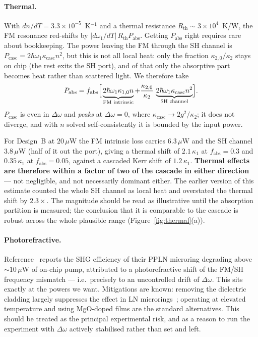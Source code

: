 \documentclass[11pt,a4paper]{article}
\newcommand{\Dom}{\Delta\omega}
\newcommand{\kcasc}{\kappa_{\text{casc}}}
\begin{document}
\paragraph{Thermal.}  With
$dn/dT=3.3\times10^{-5}$~K$^{-1}$ and a thermal resistance
$R_{\text{th}}\sim3\times10^4$~K/W, the FM resonance red-shifts by
$|d\omega_1/dT|\,R_{\text{th}}P_{\text{abs}}$.  Getting $P_{\text{abs}}$
right requires care about bookkeeping.  The power leaving the FM through
the SH channel is $P_{\text{casc}}=2\hbar\omega_1\kcasc n^2$, but this is
not all local heat: only the fraction $\kappa_{2,0}/\kappa_2$ stays on
chip (the rest exits the SH port), and of that only the absorptive part
becomes heat rather than scattered light.  We therefore take
\begin{equation}
  P_{\text{abs}}=f_{\text{abs}}\Bigl[\,
     \underbrace{2\hbar\omega_1\kappa_{1,0}n}_{\text{FM intrinsic}}
     +\frac{\kappa_{2,0}}{\kappa_2}\,
     \underbrace{2\hbar\omega_1\kcasc n^2}_{\text{SH channel}}\Bigr].
\end{equation}
$P_{\text{casc}}$ is even in $\Dom$ and \emph{peaks} at $\Dom=0$, where
$\kcasc\to2g^2/\kappa_2$; it does not diverge, and with $n$ solved
self-consistently it is bounded by the input power.

For Design~B at $20\,\mu$W the FM intrinsic loss carries $6.3\,\mu$W and
the SH channel $3.8\,\mu$W (half of it out the port), giving a thermal
shift of $2.1\,\kappa_1$ at $f_{\text{abs}}=0.3$ and $0.35\,\kappa_1$ at
$f_{\text{abs}}=0.05$, against a cascaded Kerr shift of $1.2\,\kappa_1$.
\textbf{Thermal effects are therefore within a factor of two of the
cascade in either direction} --- not negligible, and not necessarily
dominant either.  The earlier version of this estimate counted the whole
SH channel as local heat and overstated the thermal shift by $2.3\times$.
The magnitude should be read as illustrative until the absorption
partition is measured; the conclusion that it is comparable to the
cascade is robust across the whole plausible range
(Figure~\ref{fig:thermal}(a)).

\paragraph{Photorefractive.}  Reference~\cite{Lu2020} reports the SHG
efficiency of their PPLN microring degrading above $\sim10\,\mu$W of
on-chip pump, attributed to a photorefractive shift of the FM/SH
frequency mismatch --- i.e.\ precisely to an uncontrolled drift of
$\Dom$.  This sits exactly at the powers we want.  Mitigations are known:
removing the dielectric cladding largely suppresses the effect in LN
microrings~\cite{Xu2021}; operating at elevated temperature and using
MgO-doped films are the standard alternatives.  This should be treated
as the principal experimental risk, and as a reason to run the
experiment with $\Dom$ actively stabilised rather than set and left.
\end{document}
